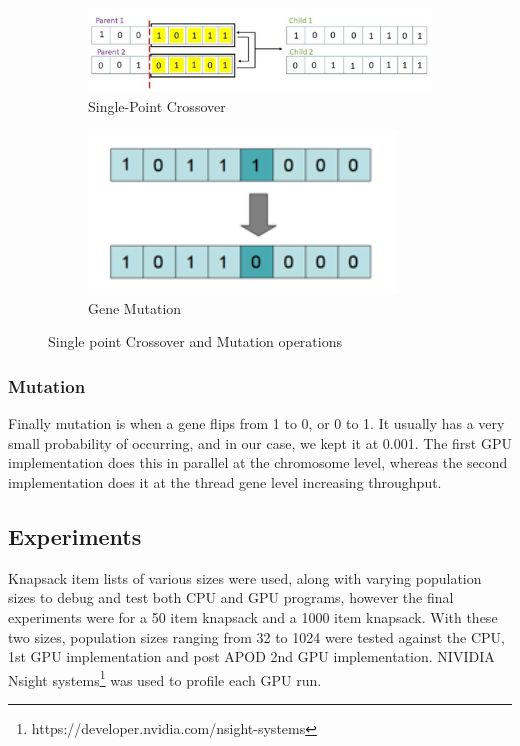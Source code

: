 \documentclass[11pt]{article}       %
\begin{document}
\begin{figure}[ht]
\begin{subfigure}{.5\textwidth}
  \centering
  \includegraphics[width=.8\linewidth]{Figures/crossover.png}  
  \caption{Single-Point Crossover}
  \label{fig:crossover}
\end{subfigure}
\begin{subfigure}{.5\textwidth}
  \centering
  \includegraphics[width=.8\linewidth]{Figures/mutation.png}  
  \caption{Gene Mutation}
  \label{fig:mutation}
\end{subfigure}
\caption{Single point Crossover and Mutation operations}
\label{fig:cross-mutate}
\end{figure}

\subsubsection{Mutation}
Finally mutation is when a gene flips from 1 to 0, or 0 to 1. It usually has a very small probability of occurring, and in our case, we kept it at 0.001. The first GPU implementation does this in parallel at the chromosome level, whereas the second implementation does it at the thread gene level increasing throughput.

\subsection{Experiments}
Knapsack item lists of various sizes were used, along with varying population sizes to debug and test both CPU and GPU programs, however the final experiments were for a 50 item knapsack and a 1000 item knapsack. With these two sizes, population sizes ranging from 32 to 1024 were tested against the CPU, 1st GPU implementation and post APOD 2nd GPU implementation.
NIVIDIA Nsight systems\footnote{https://developer.nvidia.com/nsight-systems} was used to profile each GPU run.
\end{document}
